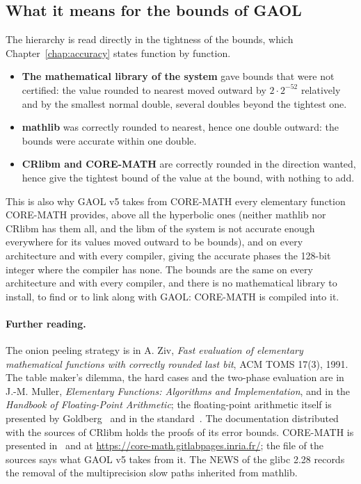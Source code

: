 \subsection{What it means for the bounds of GAOL}

The hierarchy is read directly in the tightness of the bounds, which
Chapter~\ref{chap:accuracy} states function by function.
\begin{itemize}
\item[$\bullet$] \textbf{The mathematical library of the system} gave
  bounds that were not certified: the value rounded to nearest moved outward
  by $2\cdot2^{-52}$ relatively and by the smallest normal double, several
  doubles beyond the tightest one.
\item[$\bullet$] \textbf{mathlib} was correctly rounded to nearest, hence
  one double outward: the bounds were accurate within one double.
\item[$\bullet$] \textbf{CRlibm and CORE-MATH} are correctly rounded in the
  direction wanted, hence give the tightest bound of the value at the
  bound, with nothing to add.
\end{itemize}
\noindent This is also why GAOL v5 takes from CORE-MATH every elementary
function CORE-MATH provides, above all the hyperbolic ones (neither mathlib nor
CRlibm has them all, and the libm of the system is not accurate enough
everywhere for its values moved outward to be bounds), and on every
architecture and with every compiler,  giving
the accurate phases the 128-bit integer where the compiler has none. The
bounds are the same on every architecture and with every compiler, and
there is no mathematical library to install, to find or to link along with
GAOL: CORE-MATH is compiled into it.\newinvfive

\paragraph{Further reading.} The onion peeling strategy is in A. Ziv,
\emph{Fast evaluation of elementary mathematical functions with correctly
rounded last bit}, ACM TOMS 17(3), 1991. The table maker's dilemma, the
hard cases and the two-phase evaluation are in J.-M. Muller,
\emph{Elementary Functions: Algorithms and Implementation}, and in the
\emph{Handbook of Floating-Point Arithmetic}; the floating-point arithmetic
itself is presented by Goldberg~\cite{Goldberg:01} and in the
standard~\cite{IEEE754:2008}. The documentation distributed with the sources
of CRlibm holds the proofs of its error bounds. CORE-MATH is presented
in~\cite{CoreMath:2022} and at \url{https://core-math.gitlabpages.inria.fr/};
the file  of the sources says what GAOL v5 takes from
it. The NEWS of the glibc 2.28 records the removal of the multiprecision
slow paths inherited from mathlib.

